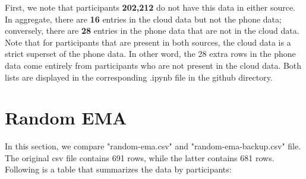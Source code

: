 \documentclass[11pt]{article}
\begin{document}
 First, we note that participants \textbf{202,212} do not have this data in either source. In aggregate, there are \textbf{16} entries in the cloud data but not the phone data; conversely, there are \textbf{28} entries in the phone data that are not in the cloud data. Note that for participants that are present in both sources, the cloud data is a strict superset of the phone data. In other word, the 28 extra rows in the phone data come entirely from participants who are not present in the cloud data. Both lists are displayed in the corresponding .ipynb file in the github directory. 
\section{Random EMA}
In this section, we compare "random-ema.csv" and "random-ema-backup.csv" file. The original csv file contains 691 rows, while the latter contains 681 rows. Following is a table that summarizes the data by participants:
\end{document}
